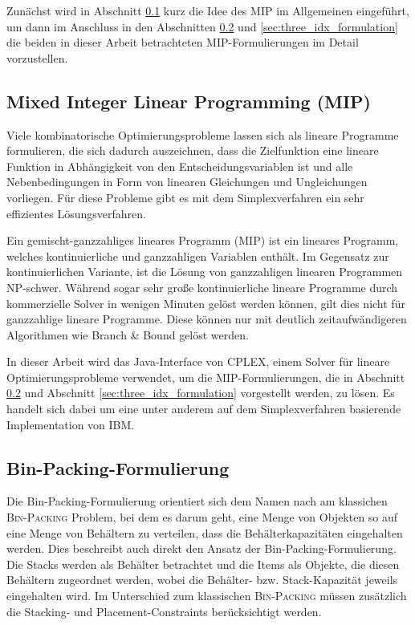 Zunächst wird in Abschnitt \ref{sec:mip_definition} kurz die Idee des MIP im Allgemeinen
eingeführt, um dann im Anschluss in den Abschnitten \ref{sec:bin_packing_formulation} und \ref{sec:three_idx_formulation} die beiden in dieser Arbeit betrachteten MIP-Formulierungen im Detail vorzustellen.

\subsection{Mixed Integer Linear Programming (MIP)}
\label{sec:mip_definition}

Viele kombinatorische Optimierungsprobleme lassen sich als lineare Programme formulieren, die sich dadurch
auszeichnen, dass die Zielfunktion eine lineare Funktion in Abhängigkeit von den Entscheidungsvariablen ist
und alle Nebenbedingungen in Form von linearen Gleichungen und Ungleichungen vorliegen. Für diese Probleme gibt es mit dem Simplexverfahren ein sehr effizientes Lösungsverfahren.\cite{Knust2017}

Ein gemischt-ganzzahliges lineares Programm (MIP) ist ein lineares Programm, welches kontinuierliche und ganzzahligen Variablen
enthält. Im Gegensatz zur kontinuierlichen Variante, ist die Lösung von ganzzahligen linearen Programmen NP-schwer.
Während sogar sehr große kontinuierliche lineare Programme durch kommerzielle Solver in wenigen Minuten gelöst werden können, gilt dies nicht für ganzzahlige lineare Programme. Diese können nur mit deutlich zeitaufwändigeren Algorithmen wie Branch \& Bound gelöst werden.\cite{Brucker2006}

In dieser Arbeit wird das Java-Interface von CPLEX, einem Solver für lineare Optimierungsprobleme verwendet,
um die MIP-Formulierungen, die in Abschnitt \ref{sec:bin_packing_formulation} und Abschnitt \ref{sec:three_idx_formulation} vorgestellt werden,
zu lösen. Es handelt sich dabei um eine unter anderem auf dem Simplexverfahren basierende Implementation von IBM. \cite{CPLEX2015}

\subsection{Bin-Packing-Formulierung}
\label{sec:bin_packing_formulation}

Die Bin-Packing-Formulierung orientiert sich dem Namen nach am klassichen \textsc{Bin-Packing} Problem, bei dem es darum geht,
eine Menge von Objekten so auf eine Menge von Behältern zu verteilen, dass die Behälterkapazitäten eingehalten werden.
Dies beschreibt auch direkt den Ansatz der Bin-Packing-Formulierung. Die Stacks werden als Behälter betrachtet und die Items als Objekte,
die diesen Behältern zugeordnet werden, wobei die Behälter- bzw. Stack-Kapazität jeweils eingehalten wird. Im Unterschied zum klassischen \textsc{Bin-Packing} müssen zusätzlich die Stacking- und Placement-Constraints berücksichtigt werden.

